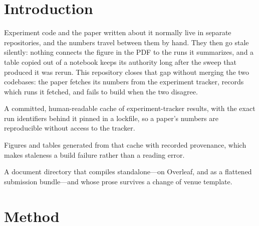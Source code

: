 
\section{Introduction}
\label{sec:introduction}

Experiment code and the paper written about it normally live in separate
repositories, and the numbers travel between them by hand. They then go stale
silently: nothing connects the figure in the PDF to the runs it summarizes, and
a table copied out of a notebook keeps its authority long after the sweep that
produced it was rerun. This repository closes that gap without merging the two
codebases: the paper fetches its numbers from the experiment tracker, records
which runs it fetched, and fails to build when the two disagree.

\begin{contributions}
\item A committed, human-readable cache of experiment-tracker results, with
  the exact run identifiers behind it pinned in a lockfile, so a paper's
  numbers are reproducible without access to the tracker.
  \label{c:cache}
\item Figures and tables generated from that cache with recorded provenance,
  which makes staleness a build failure rather than a reading error.
  \label{c:provenance}
\item A document directory that compiles standalone---on Overleaf, and as a
  flattened submission bundle---and whose prose survives a change of venue
  template.
  \label{c:portable}
\end{contributions}

\section{Method}
\label{sec:method}


